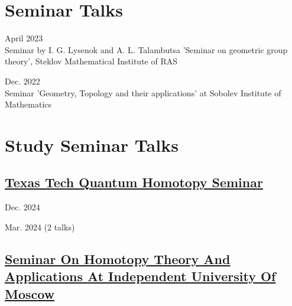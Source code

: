 \documentclass[11pt,letterpaper]{report}
\begin{document}
    
    
        
    
    
      \section*{Seminar Talks}
      
      \begin{tablist}
      
       \item{April 2023} \\ Seminar by I. G. Lysenok and A. L. Talambutsa 'Seminar on geometric group theory', Steklov Mathematical Institute of RAS
       
       \item{Dec. 2022} \\ Seminar 'Geometry, Topology and their applications' at Sobolev Institute of Mathematics
       
      
    \end{tablist}
    
    
    
    
    
    \section*{Study Seminar Talks}
    
    \subsection*{\href{https://researchseminars.org/seminar/HomotopyTheoryAndApps}{Texas Tech Quantum Homotopy Seminar}}
    
    \begin{tablist}
    
    \item{Dec. 2024} 
    
     \item{Mar. 2024}  (2 talks)
     
     \end{tablist}
    
    \subsection*{\href{https://researchseminars.org/seminar/HomotopyTheoryAndApps}{Seminar On Homotopy Theory And Applications At Independent University Of Moscow}}
    
\end{document}
